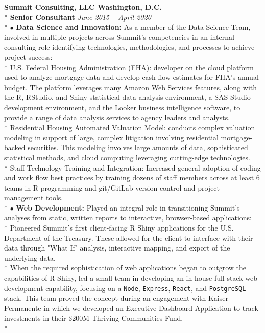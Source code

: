 \documentclass{article}
\begin{document}
\noindent \textbf{Summit Consulting, LLC \hfill Washington, D.C.} \\*
\textbf{Senior Consultant} \hfill \textit{June 2015 -- April 2020} \\*
$\bullet$ \textbf{Data Science and Innovation:} As a member of the Data Science Team, involved in multiple projects across Summit's competencies in an internal consulting role identifying technologies, methodologies, and processes to achieve project success:\\*
\indent \textendash U.S. Federal Housing Administration (FHA): developer on the cloud platform used to analyze mortgage data and develop cash flow estimates for FHA’s annual budget. The platform leverages many Amazon Web Services features, along with the R, RStudio, and Shiny statistical data analysis environment, a SAS Studio development environment, and the Looker business intelligence software, to provide a range of data analysis services to agency leaders and analysts.\\*
\indent \textendash Residential Housing Automated Valuation Model: conducts complex valuation modeling in support of large, complex litigation involving residential mortgage-backed securities. This modeling involves large amounts of data, sophisticated statistical methods, and cloud computing leveraging cutting-edge technologies.\\*
\indent \textendash Staff Technology Training and Integration: Increased general adoption of coding and work flow best practices by training dozens of staff members across at least 6 teams in R programming and git/GitLab version control and project management tools. \\*
$\bullet$ \textbf{Web Development:} Played an integral role in transitioning Summit's analyses from static, written reports to interactive, browser-based applications:\\*
\indent \textendash Pioneered Summit's first client-facing R Shiny applications for the U.S. Department of the Treasury. These allowed for the client to interface with their data through "What If" analysis, interactive mapping, and export of the underlying data.\\*
\indent \textendash When the required sophistication of web applications began to outgrow the capabilities of R Shiny, led a small team in developing an in-house full-stack web development capability, focusing on a \texttt{Node}, \texttt{Express}, \texttt{React}, and \texttt{PostgreSQL} stack. This team proved the concept during an engagement with Kaiser Permanente in which we developed an Executive Dashboard Application to track investments in their \$200M Thriving Communities Fund.\\*
\end{document}

